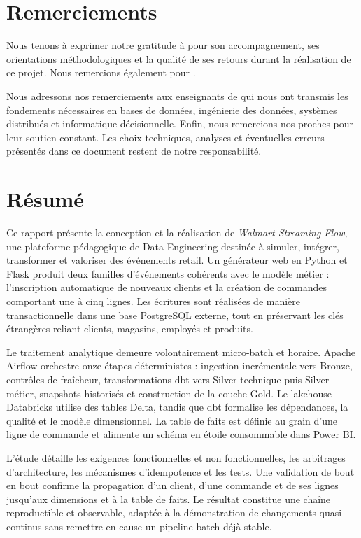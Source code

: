 \chapter*{Remerciements}
Nous tenons à exprimer notre gratitude à  pour son accompagnement, ses orientations méthodologiques et la qualité de ses retours durant la réalisation de ce projet. Nous remercions également  pour .

Nous adressons nos remerciements aux enseignants de  qui nous ont transmis les fondements nécessaires en bases de données, ingénierie des données, systèmes distribués et informatique décisionnelle. Enfin, nous remercions nos proches pour leur soutien constant. Les choix techniques, analyses et éventuelles erreurs présentés dans ce document restent de notre responsabilité.

\clearpage
\chapter*{Résumé}
Ce rapport présente la conception et la réalisation de \emph{Walmart Streaming Flow}, une plateforme pédagogique de Data Engineering destinée à simuler, intégrer, transformer et valoriser des événements retail. Un générateur web en Python et Flask produit deux familles d'événements cohérents avec le modèle métier : l'inscription automatique de nouveaux clients et la création de commandes comportant une à cinq lignes. Les écritures sont réalisées de manière transactionnelle dans une base PostgreSQL externe, tout en préservant les clés étrangères reliant clients, magasins, employés et produits.

Le traitement analytique demeure volontairement micro-batch et horaire. Apache Airflow orchestre onze étapes déterministes : ingestion incrémentale vers Bronze, contrôles de fraîcheur, transformations dbt vers Silver technique puis Silver métier, snapshots historisés et construction de la couche Gold. Le lakehouse Databricks utilise des tables Delta, tandis que dbt formalise les dépendances, la qualité et le modèle dimensionnel. La table de faits est définie au grain d'une ligne de commande et alimente un schéma en étoile consommable dans Power BI.

L'étude détaille les exigences fonctionnelles et non fonctionnelles, les arbitrages d'architecture, les mécanismes d'idempotence et les tests. Une validation de bout en bout confirme la propagation d'un client, d'une commande et de ses lignes jusqu'aux dimensions et à la table de faits. Le résultat constitue une chaîne reproductible et observable, adaptée à la démonstration de changements quasi continus sans remettre en cause un pipeline batch déjà stable.

